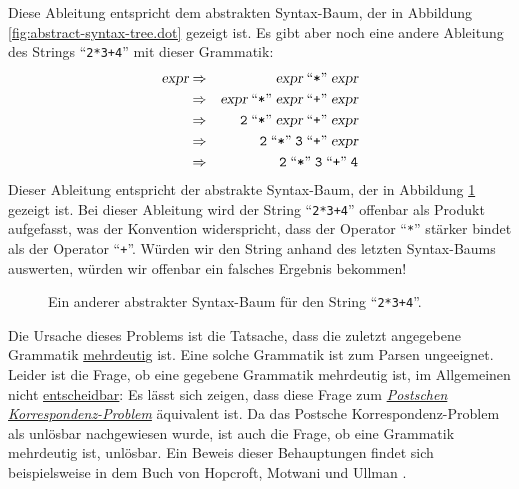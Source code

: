 Diese Ableitung entspricht dem abstrakten Syntax-Baum, der in Abbildung
\ref{fig:abstract-syntax-tree.dot}
gezeigt ist.  Es gibt aber noch eine andere Ableitung des Strings ``\texttt{2*3+4}'' mit dieser Grammatik:
\begin{eqnarray*}
\textsl{expr} & \Rightarrow & \textsl{expr} \;\mbox{``\texttt{*}''}\; \textsl{expr}                           \\
              & \Rightarrow & \textsl{expr} \;\mbox{``\texttt{*}''}\; \textsl{expr} \;\mbox{``\texttt{+}''}\; \textsl{expr}  \\
              & \Rightarrow & \texttt{2} \;\mbox{``\texttt{*}''}\; \textsl{expr} \;\mbox{``\texttt{+}''}\; \textsl{expr}     \\
              & \Rightarrow & \texttt{2} \;\mbox{``\texttt{*}''}\; \texttt{3} \;\mbox{``\texttt{+}''}\; \textsl{expr}        \\
              & \Rightarrow & \texttt{2} \;\mbox{``\texttt{*}''}\; \texttt{3} \;\mbox{``\texttt{+}''}\; \texttt{4}           
\end{eqnarray*}
Dieser Ableitung entspricht der abstrakte Syntax-Baum, der in Abbildung
\ref{fig:abstract-syntax-tree-prod.dot} gezeigt ist.
Bei dieser Ableitung wird der String ``\texttt{2*3+4}'' offenbar als Produkt aufgefasst,
was der Konvention widerspricht, dass der Operator ``\texttt{*}'' st\"arker bindet als der Operator
``\texttt{+}''.  W\"urden wir den String anhand des letzten Syntax-Baums auswerten, w\"urden wir
offenbar ein falsches Ergebnis bekommen! 
\begin{figure}[!ht]
  \centering
  \caption{Ein anderer abstrakter Syntax-Baum f\"ur den String ``\texttt{2*3+4}''.}
  \label{fig:abstract-syntax-tree-prod.dot}
\end{figure}
Die Ursache dieses Problems ist die Tatsache, dass die zuletzt angegebene Grammatik \underline{mehrdeuti}g ist.
Eine solche Grammatik ist zum Parsen ungeeignet.  Leider ist die Frage, ob eine gegebene
Grammatik mehrdeutig ist, im Allgemeinen nicht
\href{http://en.wikipedia.org/wiki/Ambiguous_grammar#Recognizing_ambiguous_grammars}{entscheidbar}:
Es l\"asst sich zeigen, dass diese Frage zum
\href{http://en.wikipedia.org/wiki/Post_correspondence_problem}{\emph{Postschen Korrespondenz-Problem}} 
\"aquivalent ist.  Da das Postsche Korrespondenz-Problem als unl\"osbar nachgewiesen wurde, ist auch die
Frage, ob eine Grammatik mehrdeutig ist, unl\"osbar.
Ein Beweis dieser Behauptungen findet sich beispielsweise in dem Buch von Hopcroft, Motwani und
Ullman \cite{hopcroft:06}. 


